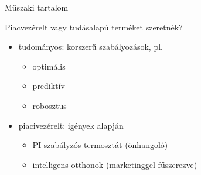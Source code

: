\documentclass[14pt,handout]{beamer}
\begin{document}
\begin{frame}{Műszaki tartalom}

Piacvezérelt vagy tudásalapú terméket szeretnék?

\begin{itemize}
	\setlength{\itemsep}{7pt}
	\item tudományos: korszerű szabályozások, pl.
	\begin{itemize}
		\item optimális
		\item prediktív
		\item robosztus%
	\end{itemize}
	\item piacivezérelt: igények alapján
	\begin{itemize}
		\item PI-szabályzós termosztát (önhangoló)
		\item intelligens otthonok (marketinggel fűszerezve)
	\end{itemize}
\end{itemize}
\end{frame}
\end{document}
